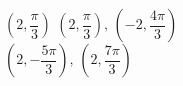 { $\left( 2, \dfrac{\pi}{3} \right)$  \label{polarpointgraphfirst}}
{$\left( 2, \dfrac{\pi}{3} \right), \, \left( -2, \dfrac{4\pi}{3} \right)$\\$\left( 2, -\dfrac{5\pi}{3} \right), \, \left( 2, \dfrac{7\pi}{3} \right)$\\ }
